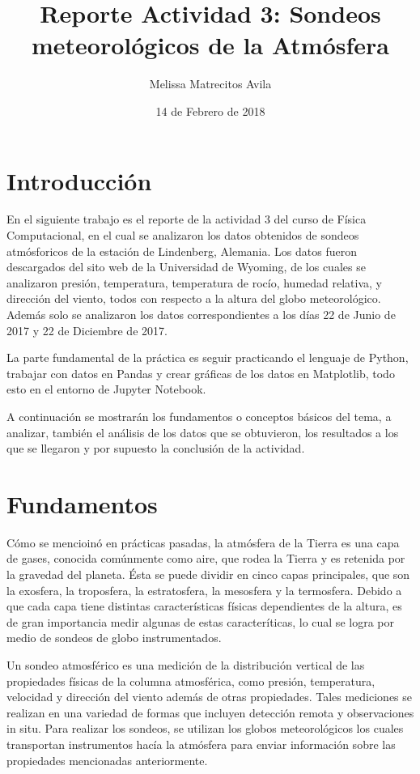 \documentclass{article}
\title{Reporte Actividad 3: Sondeos meteorológicos de la Atmósfera}
\author{Melissa Matrecitos Avila}
\date{14 de Febrero de 2018}
\begin{document}
\maketitle
\section{Introducción}
En el siguiente trabajo es el reporte de la actividad 3 del curso de Física Computacional, en el cual se analizaron los datos obtenidos de sondeos atmósforicos de la estación de Lindenberg, Alemania. Los datos fueron descargados del sito web de la Universidad de Wyoming, de los cuales se analizaron presión, temperatura, temperatura de rocío, humedad relativa, y  dirección del viento, todos con respecto a la altura del globo meteorológico. Además solo se analizaron los datos correspondientes a los días 22 de Junio de 2017 y 22 de Diciembre de 2017.

La parte fundamental de la práctica es seguir practicando el lenguaje de Python, trabajar con datos en Pandas y crear gráficas de los datos en Matplotlib, todo esto en el entorno de Jupyter Notebook.

A continuación se mostrarán los fundamentos o conceptos básicos del tema, a analizar, también el análisis de los datos que se obtuvieron, los resultados a los que se llegaron y por supuesto la conclusión de la actividad.

\section{Fundamentos}
Cómo se mencioinó en prácticas pasadas, la atmósfera de la Tierra es una capa de gases, conocida comúnmente como aire, que rodea la Tierra y es retenida por la gravedad del planeta. Ésta se puede dividir en cinco capas principales, que son la exosfera, la troposfera, la estratosfera, la mesosfera y la termosfera. Debido a que cada capa tiene distintas características físicas dependientes de la altura, es de gran importancia medir algunas de estas caracteríticas, lo cual se logra por medio de sondeos de globo instrumentados.

Un sondeo atmosférico es una medición de la distribución vertical de las propiedades físicas de la columna atmosférica, como presión, temperatura, velocidad y dirección del viento además de otras propiedades. Tales mediciones se realizan en una variedad de formas que incluyen detección remota y observaciones in situ. Para realizar los sondeos, se utilizan los globos meteorológicos los cuales transportan instrumentos hacía la atmósfera para enviar información sobre las propiedades mencionadas anteriormente.
\end{document}
